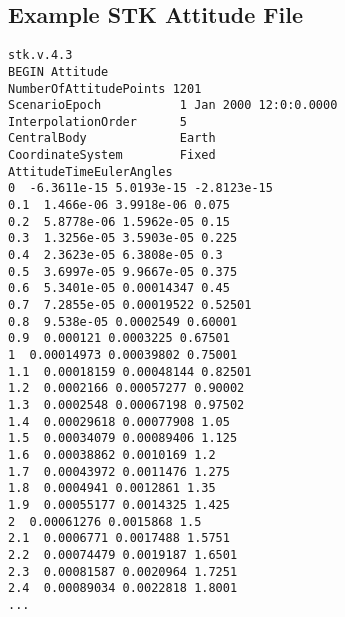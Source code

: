 \subsection{Example STK Attitude File}\label{app:afile}
\begin{verbatim}
stk.v.4.3
BEGIN Attitude
NumberOfAttitudePoints 1201
ScenarioEpoch           1 Jan 2000 12:0:0.0000
InterpolationOrder      5
CentralBody             Earth
CoordinateSystem        Fixed
AttitudeTimeEulerAngles
0  -6.3611e-15 5.0193e-15 -2.8123e-15
0.1  1.466e-06 3.9918e-06 0.075
0.2  5.8778e-06 1.5962e-05 0.15
0.3  1.3256e-05 3.5903e-05 0.225
0.4  2.3623e-05 6.3808e-05 0.3
0.5  3.6997e-05 9.9667e-05 0.375
0.6  5.3401e-05 0.00014347 0.45
0.7  7.2855e-05 0.00019522 0.52501
0.8  9.538e-05 0.0002549 0.60001
0.9  0.000121 0.0003225 0.67501
1  0.00014973 0.00039802 0.75001
1.1  0.00018159 0.00048144 0.82501
1.2  0.0002166 0.00057277 0.90002
1.3  0.0002548 0.00067198 0.97502
1.4  0.00029618 0.00077908 1.05
1.5  0.00034079 0.00089406 1.125
1.6  0.00038862 0.0010169 1.2
1.7  0.00043972 0.0011476 1.275
1.8  0.0004941 0.0012861 1.35
1.9  0.00055177 0.0014325 1.425
2  0.00061276 0.0015868 1.5
2.1  0.0006771 0.0017488 1.5751
2.2  0.00074479 0.0019187 1.6501
2.3  0.00081587 0.0020964 1.7251
2.4  0.00089034 0.0022818 1.8001
...
\end{verbatim}